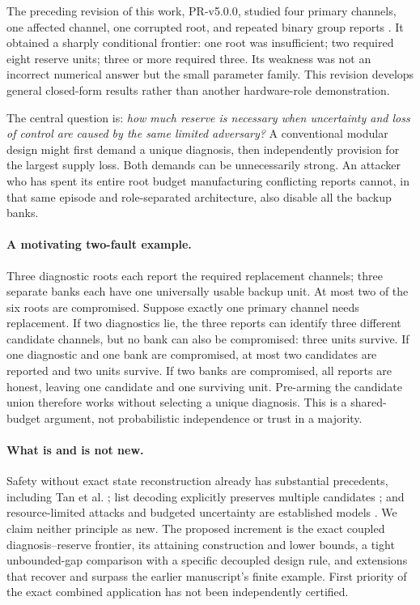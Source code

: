 \documentclass[11pt,a4paper]{article}
\theoremstyle{definition}\newtheorem{definition}{Definition}
\begin{document}
The preceding revision of this work, PR-v5.0.0, studied four primary channels, one affected channel, one corrupted root, and repeated binary group reports \cite{liu5}. It obtained a sharply conditional frontier: one root was insufficient; two required eight reserve units; three or more required three. Its weakness was not an incorrect numerical answer but the small parameter family. This revision develops general closed-form results rather than another hardware-role demonstration.

The central question is: \emph{how much reserve is necessary when uncertainty and loss of control are caused by the same limited adversary?} A conventional modular design might first demand a unique diagnosis, then independently provision for the largest supply loss. Both demands can be unnecessarily strong. An attacker who has spent its entire root budget manufacturing conflicting reports cannot, in that same episode and role-separated architecture, also disable all the backup banks.

\paragraph{A motivating two-fault example.}
Three diagnostic roots each report the required replacement channels; three separate banks each have one universally usable backup unit. At most two of the six roots are compromised. Suppose exactly one primary channel needs replacement. If two diagnostics lie, the three reports can identify three different candidate channels, but no bank can also be compromised: three units survive. If one diagnostic and one bank are compromised, at most two candidates are reported and two units survive. If two banks are compromised, all reports are honest, leaving one candidate and one surviving unit. Pre-arming the candidate union therefore works without selecting a unique diagnosis. This is a shared-budget argument, not probabilistic independence or trust in a majority.

\paragraph{What is and is not new.}
Safety without exact state reconstruction already has substantial precedents, including Tan et al. \cite{tan24,tan25}; list decoding explicitly preserves multiple candidates \cite{guruswami}; and resource-limited attacks and budgeted uncertainty are established models \cite{teixeira,bertsimas}. We claim neither principle as new. The proposed increment is the exact coupled diagnosis--reserve frontier, its attaining construction and lower bounds, a tight unbounded-gap comparison with a specific decoupled design rule, and extensions that recover and surpass the earlier manuscript's finite example. First priority of the exact combined application has not been independently certified.
\end{document}
